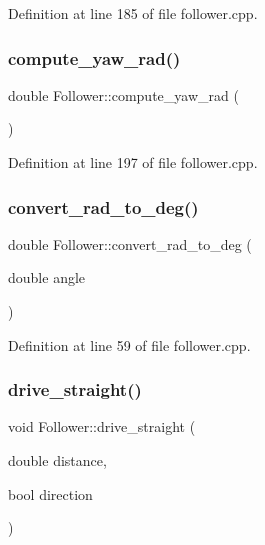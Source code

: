 Definition at line 185 of file follower.\+cpp.

\mbox{\label{class_follower_abde593631e6549062d77fb2169a17c66}} 
\subsubsection{\texorpdfstring{compute\+\_\+yaw\+\_\+rad()}{compute\_yaw\_rad()}}
{\footnotesize\ttfamily double Follower\+::compute\+\_\+yaw\+\_\+rad (\begin{DoxyParamCaption}{ }\end{DoxyParamCaption})}



Definition at line 197 of file follower.\+cpp.

\mbox{\label{class_follower_a670f07466502e1020514d6ba6b928553}} 
\subsubsection{\texorpdfstring{convert\+\_\+rad\+\_\+to\+\_\+deg()}{convert\_rad\_to\_deg()}}
{\footnotesize\ttfamily double Follower\+::convert\+\_\+rad\+\_\+to\+\_\+deg (\begin{DoxyParamCaption}\item[{double}]{angle }\end{DoxyParamCaption})}



Definition at line 59 of file follower.\+cpp.

\mbox{\label{class_follower_ad4d1ce6f43ce65c0aa5a560247ca55ad}} 
\subsubsection{\texorpdfstring{drive\+\_\+straight()}{drive\_straight()}}
{\footnotesize\ttfamily void Follower\+::drive\+\_\+straight (\begin{DoxyParamCaption}\item[{double}]{distance,  }\item[{bool}]{direction }\end{DoxyParamCaption})}



